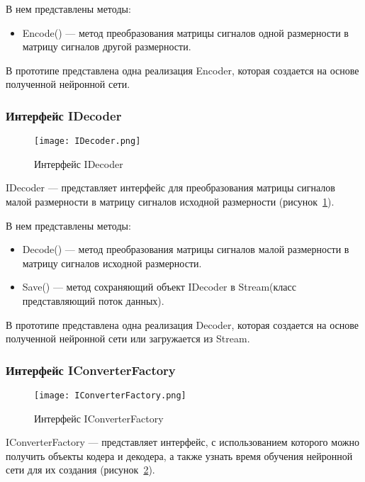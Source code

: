 В нем представлены методы:
\begin{itemize}
  \item Encode() --- метод преобразования матрицы сигналов одной размерности в матрицу сигналов другой размерности.
\end{itemize}

В прототипе представлена одна реализация Encoder, которая создается на основе полученной нейронной сети.

\subsubsection{Интерфейс IDecoder}
\label{subsub:development:types:idecoder}

\begin{figure}[ht]
\centering
  \texttt{[image: IDecoder.png]}
  \caption{ Интерфейс IDecoder }
  \label{fig:idecoder}
\end{figure}
IDecoder --- представляет интерфейс для преобразования матрицы сигналов малой размерности в матрицу сигналов исходной размерности (рисунок~\ref{fig:idecoder}).

В нем представлены методы:
\begin{itemize}
  \item Decode() --- метод преобразования матрицы сигналов малой размерности в матрицу сигналов исходной размерности.
  \item Save() --- метод сохраняющий объект IDecoder в Stream(класс представляющий поток данных).
\end{itemize}

В прототипе представлена одна реализация Decoder, которая создается на основе полученной нейронной сети или загружается из Stream.

\subsubsection{Интерфейс IConverterFactory}
\label{subsub:development:types:iconverterfactory}

\begin{figure}[ht]
\centering
  \texttt{[image: IConverterFactory.png]}
  \caption{ Интерфейс IConverterFactory }
  \label{fig:iconverterfactory}
\end{figure}
IConverterFactory --- представляет интерфейс, с использованием которого можно получить объекты кодера и декодера,
а также узнать время обучения нейронной сети для их создания (рисунок~\ref{fig:iconverterfactory}).

